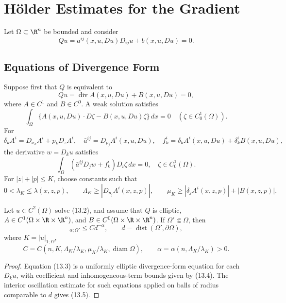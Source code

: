 \chapter{H\"older Estimates for the Gradient}

Let $\Omega\subset\R^n$ be bounded and consider
\begin{equation}
Qu=a^{ij}(x,u,Du)D_{ij}u+b(x,u,Du)=0.
\tag{13.1}
\end{equation}

\section{Equations of Divergence Form}

Suppose first that $Q$ is equivalent to
\begin{equation}
Qu=\operatorname{div}A(x,u,Du)+B(x,u,Du)=0,
\tag{13.2}
\end{equation}
where $A\in C^1$ and $B\in C^0$.  A weak solution satisfies
\[
\int_\Omega\{A(x,u,Du)\cdot D\zeta-B(x,u,Du)\zeta\}\,dx=0
\quad(\zeta\in C_0^1(\Omega)).
\]
For
\[
\delta_k A^i=D_{x_k}A^i+p_kD_zA^i,
\quad
\bar a^{ij}=D_{p_j}A^i(x,u,Du),
\quad
f_k^i=\delta_kA^i(x,u,Du)+\delta_k^iB(x,u,Du),
\]
the derivative $w=D_ku$ satisfies
\begin{equation}
\int_\Omega(\bar a^{ij}D_jw+f_k^i)D_i\zeta\,dx=0,
\quad \zeta\in C_0^1(\Omega).
\tag{13.3}
\end{equation}
For $|z|+|p|\le K$, choose constants such that
\begin{equation}
0<\lambda_K\le\lambda(x,z,p),\qquad
\Lambda_K\ge |D_{p_j}A^i(x,z,p)|,
\qquad
\mu_K\ge |\delta_jA^i(x,z,p)|+|B(x,z,p)|.
\tag{13.4}
\end{equation}

\begin{theorem}
\label{thm:gt13-holder-gradient-13-1}
Let $u\in C^2(\Omega)$ solve \textup{(13.2)}, and assume that $Q$ is elliptic,
$A\in C^1(\Omega\times\R\times\R^n)$, and
$B\in C^0(\Omega\times\R\times\R^n)$.  If $\Omega'\Subset\Omega$, then
\begin{equation}
[Du]_{\alpha;\Omega'}\le Cd^{-\alpha},
\qquad d=\operatorname{dist}(\Omega',\partial\Omega),
\tag{13.5}
\end{equation}
where $K=|u|_{1;\Omega}$,
\[
C=C(n,K,\Lambda_K/\lambda_K,\mu_K/\lambda_K,
\operatorname{diam}\Omega),
\qquad
\alpha=\alpha(n,\Lambda_K/\lambda_K)>0.
\]
\end{theorem}
\begin{proof}
\sketch Equation \textup{(13.3)} is a uniformly elliptic divergence-form
equation for each $D_ku$, with coefficient and inhomogeneous-term bounds
given by \textup{(13.4)}.  The interior oscillation estimate for such equations
applied on balls of radius comparable to $d$ gives \textup{(13.5)}.
\end{proof}

